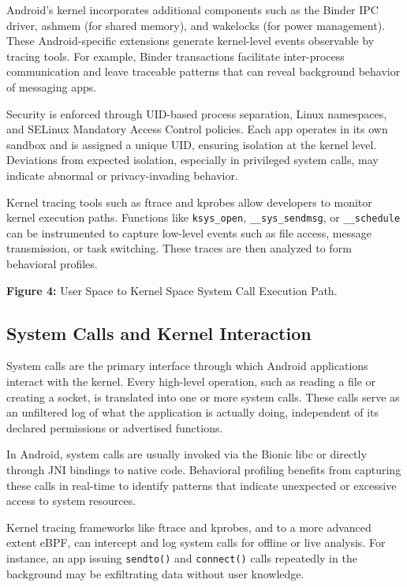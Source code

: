 \documentclass[a4paper,12pt]{report}
\begin{document}
Android’s kernel incorporates additional components such as the Binder IPC driver, ashmem (for shared memory), and wakelocks (for power management). These Android-specific extensions generate kernel-level events observable by tracing tools. For example, Binder transactions facilitate inter-process communication and leave traceable patterns that can reveal background behavior of messaging apps.

Security is enforced through UID-based process separation, Linux namespaces, and SELinux Mandatory Access Control policies. Each app operates in its own sandbox and is assigned a unique UID, ensuring isolation at the kernel level. Deviations from expected isolation, especially in privileged system calls, may indicate abnormal or privacy-invading behavior.

Kernel tracing tools such as ftrace and kprobes allow developers to monitor kernel execution paths. Functions like \texttt{ksys\_open}, \texttt{\_\_sys\_sendmsg}, or \texttt{\_\_schedule} can be instrumented to capture low-level events such as file access, message transmission, or task switching. These traces are then analyzed to form behavioral profiles.

\textbf{Figure 4:} User Space to Kernel Space System Call Execution Path.

\subsection{System Calls and Kernel Interaction}
System calls are the primary interface through which Android applications interact with the kernel. Every high-level operation, such as reading a file or creating a socket, is translated into one or more system calls. These calls serve as an unfiltered log of what the application is actually doing, independent of its declared permissions or advertised functions.

In Android, system calls are usually invoked via the Bionic libc or directly through JNI bindings to native code. Behavioral profiling benefits from capturing these calls in real-time to identify patterns that indicate unexpected or excessive access to system resources.

Kernel tracing frameworks like ftrace and kprobes, and to a more advanced extent eBPF, can intercept and log system calls for offline or live analysis. For instance, an app issuing \texttt{sendto()} and \texttt{connect()} calls repeatedly in the background may be exfiltrating data without user knowledge.
\end{document}
